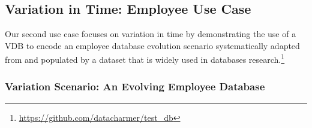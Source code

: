 \subsection{Variation in Time: Employee Use Case}
\label{sec:emp-vdb}



%
%

Our second use case focuses on variation in time by demonstrating
the use of a VDB to encode an employee database evolution scenario
systematically adapted from
\cite{prima08Moon}  and populated by a dataset that is widely used
in databases research.\footnote{\url{https://github.com/datacharmer/test_db}}


\subsubsection{Variation Scenario: An Evolving Employee Database}
\label{sec:emp-scenario}

